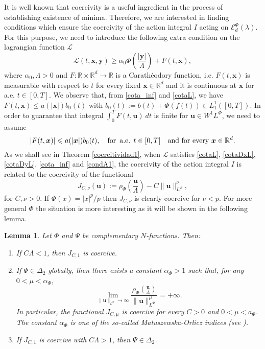 \documentclass[twoside]{elsarticle}
\newtheorem{lem}[thm]{Lemma}
\theoremstyle{remark}
\newcommand{\orlnor}{\|_{L^{\Phi}}}
\newcommand{\lphi}{L^{\Phi}}
\newcommand{\wphi}{W^{1}\lphi}
\newcommand{\domi}{\mathcal{E}^{\Phi}_d(\lambda)}
\renewcommand{\b}[1]{\boldsymbol{#1}}
\newcommand{\rr}{\mathbb{R}}
\renewcommand{\leq}{\leqslant}
\begin{document}
It is well known that coercivity is a useful ingredient in the process of establishing existence of minima. Therefore, we are interested in finding conditions which ensure the coercivity of the action integral $I$ acting on $\domi$. For this purpose, we need to introduce the following  extra condition on the lagrangian function $\mathcal{L}$  
\begin{equation}\label{cota_inf}
\mathcal{L}(t,\b{x},\b{y})\geq \alpha_0\Phi\left(\frac{|\b{y}|}{\Lambda}\right)+ F(t,\b{x}),
\end{equation}
where $\alpha_0,\Lambda>0$ and  $F:\rr\times\rr^d\to\rr$ is a Carath\'eodory function, i.e. $F(t,\b{x})$ is  measurable with respect to $t$ for every fixed  $\b{x}\in\rr^d$ and it is continuous at $\b{x}$ for a.e. $t\in [0,T]$. We observe that, from \eqref{cota_inf} and \eqref{cotaL}, we have $F(t,\b{x})\leq a(|\b{x}|)b_0(t)$  with $b_0(t):=b(t)+\Phi(f(t))\in L^1_1([0,T])$. In order to guarantee that integral $\int_0^TF(t,\b{u})\ dt$ is finite for $\b{u}\in\wphi$,  we need to assume 
\begin{equation}\label{condA1} |F(t,\b{x})|\leq a(|\b{x}|)b_0(t),\quad\text{for \,a.e. }t\in [0,T] \quad\text{and for every } \b{x}\in\rr^d.
\end{equation}
As we shall see in Theorem \ref{coercitividad1}, when $\mathcal{L}$ satisfies \eqref{cotaL}, \eqref{cotaDxL}, \eqref{cotaDyL}, \eqref{cota_inf} and \eqref{condA1},  the coercivity of the action integral $I$ is related to the coercivity of the functional
\begin{equation}\label{func_phi}
  J_{C,\nu}(\b{u}):= \rho_{\Phi}\left(\frac{\b{u}}{\Lambda}\right)-C\|\b{u}\orlnor^{\nu},
\end{equation}
for $C,\nu>0$. If $\Phi(x)=|x|^p/p$ then $J_{C,\nu}$ is clearly coercive for $\nu<p$. For more general $\Phi$ the situation is more interesting   as it will be shown in the following lemma.

\begin{lem}\label{lem_coer} Let $\Phi$ and $\Psi$ be complementary $N$-functions. Then:
\begin{enumerate}
  \item If $C\Lambda<1$, then $J_{C,1}$ is coercive. 
  
  \item If $\Psi \in \Delta_2$ globally, then there exists a constant $\alpha_{\Phi}>1$ such that, for any $0<\mu<\alpha_{\Phi}$,
\begin{equation}\label{coer_modular} \lim\limits_{\|\b{u}\orlnor \to \infty} \frac{\rho_{\Phi}\left(\frac{\b{u}}{\Lambda}\right)}{\|\b{u}\orlnor^{\mu}}=+\infty.
\end{equation}
In particular, the functional $J_{C,\mu}$ is coercive for every $C>0$ and  $0<\mu<a_{\Phi}$. The constant $\alpha_{\Phi}$ is one of the so-called \emph{ Matuszewska-Orlicz indices} (see \cite[Ch. 11]{M}).
\item If $J_{C,1}$ is coercive with $C\Lambda>1$, then $\Psi \in \Delta_2$.  
\end{enumerate}
\end{lem}
\end{document}
